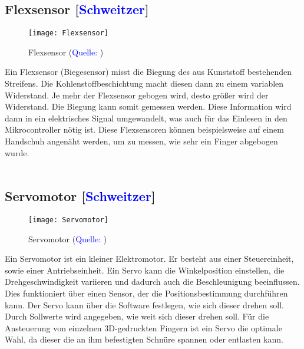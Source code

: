 \documentclass[titlepage,12pt,twoside]{article}
\begin{document}
\subsection{Flexsensor [\textcolor{blue}{Schweitzer}]}
\label{chap:Flexsensor}
\begin{figure}[H]
	\begin{center}
		\scalebox{0.6}
		{\texttt{[image: Flexsensor]}}
		\caption{Flexsensor (\textcolor{blue}{Quelle: \cite{Flexsensorabbildung}})}
		\label{fig:Flexsensor}
	\end{center}
\end{figure}
\hfill \break
Ein Flexsensor (Biegesensor) misst die Biegung des aus Kunststoff bestehenden 
Streifens. Die Kohlenstoffbeschichtung macht diesen dann zu einem variablen 
Widerstand. Je mehr der Flexsensor gebogen wird, desto größer wird der Widerstand. 
Die Biegung kann somit gemessen werden. Diese Information wird dann in ein 
elektrisches Signal umgewandelt, was auch für das Einlesen in den Mikrocontroller 
nötig ist. Diese Flexsensoren können beispielsweise auf einem Handschuh angenäht 
werden, um zu messen, wie sehr ein Finger abgebogen wurde. \\
\\

\subsection{Servomotor [\textcolor{blue}{Schweitzer}]}
\label{chap:Servomotor}
\begin{figure}[H]
	\begin{center}
		\scalebox{0.6}
		{\texttt{[image: Servomotor]}}
		\caption{Servomotor (\textcolor{blue}{Quelle: \cite{Servoabbildung}})}
		\label{fig:Servomotor}
	\end{center}
\end{figure}
\hfill \break
Ein Servomotor ist ein kleiner Elektromotor. Er besteht aus einer Steuereinheit, 
sowie einer Antriebseinheit. Ein Servo kann die Winkelposition einstellen, die 
Drehgeschwindigkeit variieren und dadurch auch die Beschleunigung beeinflussen. 
Dies funktioniert über einen Sensor, der die Positionsbestimmung durchführen kann. 
Der Servo kann über die Software festlegen, wie sich dieser drehen soll. Durch 
Sollwerte wird angegeben, wie weit sich dieser drehen soll. Für die Ansteuerung 
von einzelnen 3D-gedruckten Fingern ist ein Servo die optimale Wahl, da dieser 
die an ihm befestigten Schnüre spannen oder entlasten kann. \\
\\
\end{document}
